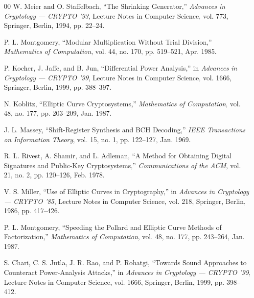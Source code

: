 \documentclass[conference, a4paper]{IEEEtran}
\begin{document}
\begin{thebibliography}{00}
 W. Meier and O. Staffelbach, ``The Shrinking Generator,'' \emph{Advances in Cryptology — CRYPTO '93}, Lecture Notes in Computer Science, vol. 773, Springer, Berlin, 1994, pp. 22--24.

 P. L. Montgomery, ``Modular Multiplication Without Trial Division,'' \emph{Mathematics of Computation}, vol. 44, no. 170, pp. 519--521, Apr. 1985.

 P. Kocher, J. Jaffe, and B. Jun, ``Differential Power Analysis,'' in \emph{Advances in Cryptology — CRYPTO '99}, Lecture Notes in Computer Science, vol. 1666, Springer, Berlin, 1999, pp. 388--397.

 N. Koblitz, ``Elliptic Curve Cryptosystems,'' \emph{Mathematics of Computation}, vol. 48, no. 177, pp. 203--209, Jan. 1987.

 J. L. Massey, ``Shift-Register Synthesis and BCH Decoding,'' \emph{IEEE Transactions on Information Theory}, vol. 15, no. 1, pp. 122--127, Jan. 1969.

 R. L. Rivest, A. Shamir, and L. Adleman, ``A Method for Obtaining Digital Signatures and Public-Key Cryptosystems,'' \emph{Communications of the ACM}, vol. 21, no. 2, pp. 120--126, Feb. 1978.

 V. S. Miller, ``Use of Elliptic Curves in Cryptography,'' in \emph{Advances in Cryptology — CRYPTO '85}, Lecture Notes in Computer Science, vol. 218, Springer, Berlin, 1986, pp. 417--426.

 P. L. Montgomery, ``Speeding the Pollard and Elliptic Curve Methods of Factorization,'' \emph{Mathematics of Computation}, vol. 48, no. 177, pp. 243--264, Jan. 1987.

 S. Chari, C. S. Jutla, J. R. Rao, and P. Rohatgi, ``Towards Sound Approaches to Counteract Power-Analysis Attacks,'' in \emph{Advances in Cryptology — CRYPTO '99}, Lecture Notes in Computer Science, vol. 1666, Springer, Berlin, 1999, pp. 398--412.
\end{thebibliography}
\end{document}
